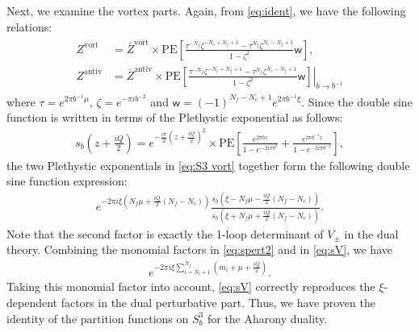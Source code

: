 \documentclass[a4paper,11pt]{article}
\begin{document}
Next, we examine the vortex parts. Again, from \eqref{eq:ident}, we have the following relations:
\begin{align}
\begin{aligned}
\label{eq:S3 vort}
Z^\text{vort} &= \bar Z^\text{vort} \times \mathrm{PE}\left[\frac{\tau^{-N_f} \zeta^{-N_c+N_f+1}-\tau^{N_f} \zeta^{N_c-N_f+1}}{1-\zeta^2} \mathsf w \right], \\
Z^\text{antiv} &= \bar Z^\text{antiv} \times \left.\mathrm{PE}\left[\frac{\tau^{-N_f} \zeta^{-N_c+N_f+1}-\tau^{N_f} \zeta^{N_c-N_f+1}}{1-\zeta^2} \mathsf w \right]\right|_{b \rightarrow b^{-1}}
\end{aligned}
\end{align}
where $\tau = e^{2 \pi b^{-1} \mu}$, $\zeta = e^{-\pi i b^{-2}}$ and $\mathsf w = (-1)^{N_f-N_c+1} e^{2 \pi b^{-1} \xi}$. Since the double sine function is written in terms of the Plethystic exponential as follows:
\begin{align}
s_b \left(z+\frac{i Q}{2}\right) = e^{-\frac{i \pi}{2} (z+\frac{i Q}{2})^2} \times \mathrm{PE}\left[\frac{e^{2 \pi b z}}{1-e^{-2 i \pi b^2}}+\frac{e^{2 \pi b^{-1} z}}{1-e^{-2 i \pi b^{-2}}}\right],
\end{align}
the two Plethystic exponentials in \eqref{eq:S3 vort} together form the following double sine function expression:
\begin{align}
\label{eq:sV}
e^{-2 \pi i \xi (N_f \mu+\frac{i Q}{2} (N_f-N_c))} \frac{s_b(\xi-N_f \mu-\frac{i Q}{2} (N_f-N_c))}{s_b(\xi+N_f \mu+\frac{i Q}{2} (N_f-N_c))}.
\end{align}
Note that the second factor is exactly the 1-loop determinant of $V_\pm$ in the dual theory. Combining the monomial factors in \eqref{eq:spert2} and in \eqref{eq:sV}, we have
\begin{align}
\label{eq:smon}
e^{-2 \pi i \xi \sum_{i = N_c+1}^{N_f} (m_i+\mu+\frac{i Q}{2})}.
\end{align}
Taking this monomial factor into account, \eqref{eq:sV} correctly reproduces the $\xi$-dependent factors in the dual perturbative part. Thus, we have proven the identity of the partition functions on $S^3_b$ for the Aharony duality.
\\
\end{document}
